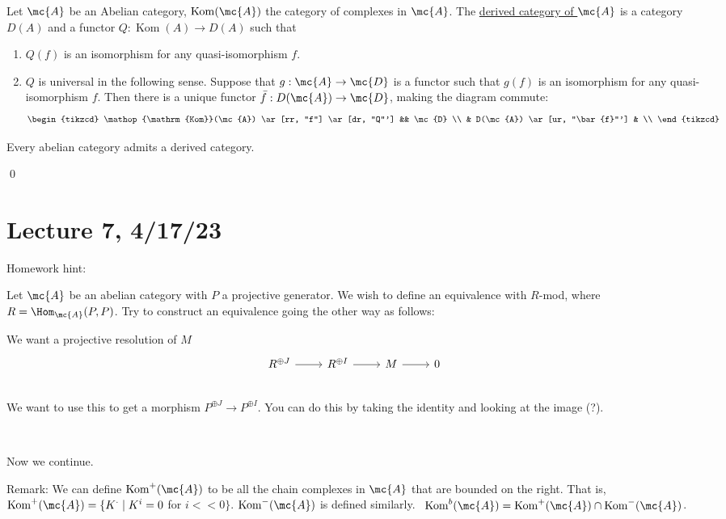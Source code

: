 \documentclass[x11names,reqno,14pt]{extarticle}
\DeclareMathOperator{\Kom}{Kom}
\begin{document}
Let $\mc{A}$ be an Abelian category, $\Kom(\mc{A})$ the category of complexes in $\mc{A}$. The \underline{derived category of $\mc{A}$} is a category $D(A)$ and a functor $Q:\Kom(A)\to D(A)$ such that
\begin{enumerate}[label=(\alph*)]

\item $Q(f)$ is an isomorphism for any quasi-isomorphism $f$. 

\item $Q$ is universal in the following sense. Suppose that $g:\mc{A}\to \mc{D}$ is a functor such that $g(f)$ is an isomorphism for any quasi-isomorphism $f$. Then there is a unique functor $\bar{f}:D(\mc{A})\to\mc{D}$, making the diagram commute:
\[
\begin{tikzcd}
\Kom(\mc{A}) \ar[rr, "f"] \ar[dr, "Q"'] && \mc{D} \\
& D(\mc{A}) \ar[ur, "\bar{f}"'] & \\
\end{tikzcd}
\]

\end{enumerate}

\thm

Every abelian category admits a derived category.

\proof

\qed

\section*{Lecture 7, 4/17/23}

Homework hint:

Let $\mc{A}$ be an abelian category with $P$ a projective generator. We wish to define an equivalence with $R$-mod, where $R = \Hom_{\mc{A}}(P,P)$. Try to construct an equivalence going the other way as follows:

We want a projective resolution of $M$ 
\[
\begin{tikzcd}
R^{\oplus J} \ar[r] & R^{\oplus I} \ar[r] & M \ar[r] & 0 \\
\end{tikzcd}
\]
We want to use this to get a morphism $P^{\oplus J} \to P^{\oplus I}$. You can do this by taking the identity and looking at the image (?).

\,

Now we continue. 

Remark: We can define $\Kom^+(\mc{A})$ to be all the chain complexes in $\mc{A}$ that are bounded on the right. That is, $\Kom^+(\mc{A}) = \{K^\cdot \mid K^i = 0$ for $i << 0\}$. $\Kom^{-}(\mc{A})$ is defined similarly. 
\,
$\Kom^b(\mc{A}) = \Kom^+(\mc{A}) \cap \Kom^-(\mc{A})$. 
\end{document}
